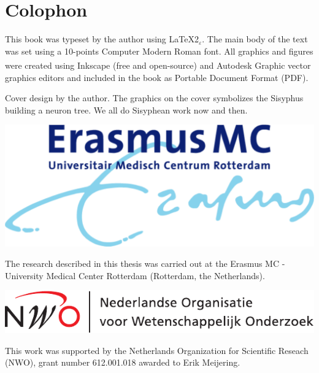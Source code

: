 
\newpage
\setlength{\parindent}{0pt}
\thispagestyle{empty}

\section*{Colophon}

\bigskip
This book was typeset by the author using \LaTeX{}2{\LARGE $_{\varepsilon}$}. The main body of the text was set using a 10-points Computer Modern Roman font. All graphics and figures were created using Inkscape (free and open-source) and Autodesk \textsuperscript{\textregistered}Graphic vector graphics editors and included in the book as Portable Document Format (PDF). %

\bigskip
Cover design by the author. The graphics on the cover symbolizes the Sisyphus building a neuron tree. We all do Sisyphean work now and then.
\bigskip

\vfill
\includegraphics[height=0.08\textheight]{./logos/emc} %

The research described in this thesis was carried out at the Erasmus MC - University Medical Center Rotterdam (Rotterdam, the Netherlands). 
\bigskip

\includegraphics[height=0.07\textheight]{./logos/nwo-nl}

This work was supported by the Netherlands Organization for Scientific Reseach (NWO), grant number 612.001.018 awarded to Erik Meijering.
\bigskip

